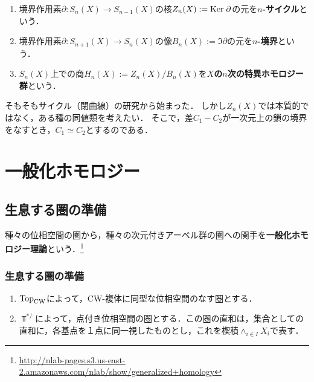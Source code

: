 \documentclass[uplatex,dvipdfmx]{jsreport}
\begin{document}
\begin{definition}\mbox{}
    \begin{enumerate}
        \item 境界作用素$\partial:S_n(X)\to S_{n-1}(X)$の核$Z_n(X):=\mathrm{Ker}\;\partial$の元を\textbf{$n$-サイクル}という．
        \item 境界作用素$\partial:S_{n+1}(X)\to S_{n}(X)$の像$B_n(X):=\Im\partial$の元を\textbf{$n$-境界}という．
        \item $S_n(X)$上での商$H_n(X):=Z_n(X)/B_n(X)$を\textbf{$X$の$n$次の特異ホモロジー群}という．
    \end{enumerate}
\end{definition}
\begin{remarks}
    そもそもサイクル（閉曲線）の研究から始まった．
    しかし$Z_n(X)$では本質的ではなく，ある種の同値類を考えたい．
    そこで，差$C_1-C_2$が一次元上の鎖の境界をなすとき，$C_1\simeq C_2$とするのである．
\end{remarks}

\chapter{一般化ホモロジー}

\section{生息する圏の準備}

\begin{tcolorbox}[colframe=ForestGreen, colback=ForestGreen!10!white,breakable,colbacktitle=ForestGreen!40!white,coltitle=black,fonttitle=\bfseries\sffamily,
title=]
    種々の位相空間の圏から，種々の次元付きアーベル群の圏への関手を\textbf{一般化ホモロジー理論}という．\footnote{\url{http://nlab-pages.s3.us-east-2.amazonaws.com/nlab/show/generalized+homology}}
\end{tcolorbox}

\subsection{生息する圏の準備}

\begin{notation}\mbox{}
    \begin{enumerate}
        \item $\mathrm{Top}_{\mathrm{CW}}$によって，CW-複体に同型な位相空間のなす圏とする．
        \item $\Top^{*/}$によって，点付き位相空間の圏とする．この圏の直和は，集合としての直和に，各基点を１点に同一視したものとし，これを楔積$\wedge_{i\in I}X_i$で表す．
    \end{enumerate}
\end{notation}
\end{document}

